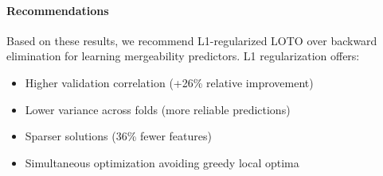 \paragraph{Recommendations}
Based on these results, we recommend L1-regularized LOTO over backward elimination for learning mergeability predictors. L1 regularization offers:
\begin{itemize}
    \item Higher validation correlation (+26\% relative improvement)
    \item Lower variance across folds (more reliable predictions)
    \item Sparser solutions (36\% fewer features)
    \item Simultaneous optimization avoiding greedy local optima
\end{itemize}
